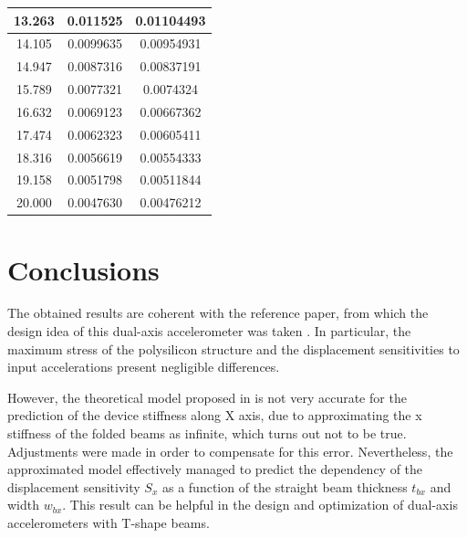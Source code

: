 \documentclass[lettersize,journal]{IEEEtran}
\begin{document}
\begin{table}[h]
\begin{tabular}{|c|c|c|}
            13.263       & 0.011525     & 0.01104493                \\ \hline
            14.105       & 0.0099635     & 0.00954931                  \\ \hline
            14.947       & 0.0087316     & 0.00837191                  \\ \hline
            15.789       & 0.0077321     & 0.0074324                  \\ \hline
            16.632       & 0.0069123     & 0.00667362                 \\ \hline
            17.474       & 0.0062323     & 0.00605411                \\ \hline
            18.316       & 0.0056619     & 0.00554333               \\ \hline
            19.158       & 0.0051798     & 0.00511844               \\ \hline
            20.000       & 0.0047630     & 0.00476212               \\ \hline
        \end{tabular}
        \label{tab:wbx_sweep_adj}
    \end{table}
    
    \section{Conclusions}
    The obtained results are coherent with the reference paper, from which the design idea of this dual-axis accelerometer was taken \cite{original}. In particular, the maximum stress of the polysilicon structure and the displacement sensitivities to input accelerations present negligible differences.
    
    However, the theoretical model proposed in \cite{original} is not very accurate for the prediction of the device stiffness along X axis, due to approximating the x stiffness of the folded beams as infinite, which turns out not to be true. Adjustments were made in order to compensate for this error. Nevertheless, the approximated model effectively managed to predict the dependency of the displacement sensitivity \(S_x\) as a function of the straight beam thickness \(t_{bx}\) and width \(w_{bx}\). This result can be helpful in the design and optimization of dual-axis accelerometers with T-shape beams.
    
    \printbibliography
\end{document}
